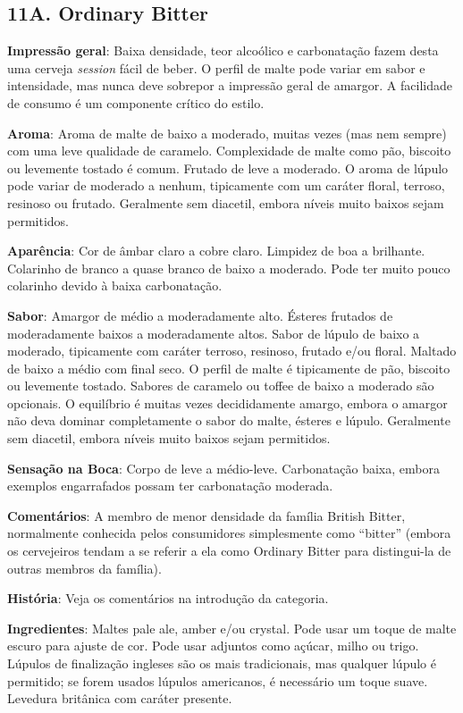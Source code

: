 \subsection*{11A. Ordinary Bitter}
\textbf{Impressão geral}: Baixa densidade, teor alcoólico e carbonatação fazem desta uma cerveja \textit{session} fácil de beber. O perfil de malte pode variar em sabor e intensidade, mas nunca deve sobrepor a impressão geral de amargor. A facilidade de consumo é um componente crítico do estilo.

\textbf{Aroma}: Aroma de malte de baixo a moderado, muitas vezes (mas nem sempre) com uma leve qualidade de caramelo. Complexidade de malte como pão, biscoito ou levemente tostado é comum. Frutado de leve a moderado. O aroma de lúpulo pode variar de moderado a nenhum, tipicamente com um caráter floral, terroso, resinoso ou frutado. Geralmente sem diacetil, embora níveis muito baixos sejam permitidos.

\textbf{Aparência}: Cor de âmbar claro a cobre claro. Limpidez de boa a brilhante. Colarinho de branco a quase branco de baixo a moderado. Pode ter muito pouco colarinho devido à baixa carbonatação.

\textbf{Sabor}: Amargor de médio a moderadamente alto. Ésteres frutados de moderadamente baixos a moderadamente altos. Sabor de lúpulo de baixo a moderado, tipicamente com caráter terroso, resinoso, frutado e/ou floral. Maltado de baixo a médio com final seco. O perfil de malte é tipicamente de pão, biscoito ou levemente tostado. Sabores de caramelo ou toffee de baixo a moderado são opcionais. O equilíbrio é muitas vezes decididamente amargo, embora o amargor não deva dominar completamente o sabor do malte, ésteres e lúpulo. Geralmente sem diacetil, embora níveis muito baixos sejam permitidos.

\textbf{Sensação na Boca}: Corpo de leve a médio-leve. Carbonatação baixa, embora exemplos engarrafados possam ter carbonatação moderada.

\textbf{Comentários}: A membro de menor densidade da família British Bitter, normalmente conhecida pelos consumidores simplesmente como “bitter” (embora os cervejeiros tendam a se referir a ela como Ordinary Bitter para distingui-la de outras membros da família).

\textbf{História}: Veja os comentários na introdução da categoria.

\textbf{Ingredientes}: Maltes pale ale, amber e/ou crystal. Pode usar um toque de malte escuro para ajuste de cor. Pode usar adjuntos como açúcar, milho ou trigo. Lúpulos de finalização ingleses são os mais tradicionais, mas qualquer lúpulo é permitido; se forem usados lúpulos americanos, é necessário um toque suave. Levedura britânica com caráter presente.

